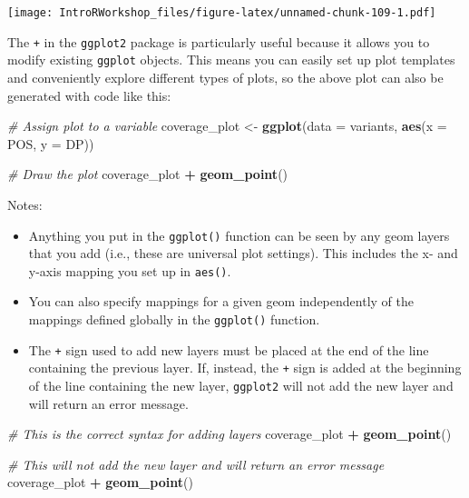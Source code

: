 \documentclass[]{book}
\newenvironment{Shaded}{\begin{snugshade}}{\end{snugshade}}
\newcommand{\CommentTok}[1]{\textcolor[rgb]{0.56,0.35,0.01}{\textit{#1}}}
\newcommand{\DataTypeTok}[1]{\textcolor[rgb]{0.13,0.29,0.53}{#1}}
\newcommand{\KeywordTok}[1]{\textcolor[rgb]{0.13,0.29,0.53}{\textbf{#1}}}
\newcommand{\NormalTok}[1]{#1}
\newcommand{\OperatorTok}[1]{\textcolor[rgb]{0.81,0.36,0.00}{\textbf{#1}}}
\newcommand{\StringTok}[1]{\textcolor[rgb]{0.31,0.60,0.02}{#1}}
\providecommand{\tightlist}{%
  \setlength{\itemsep}{0pt}\setlength{\parskip}{0pt}}
\begin{document}
\texttt{[image: IntroRWorkshop\_files/figure-latex/unnamed-chunk-109-1.pdf]}

The \texttt{+} in the \texttt{ggplot2} package is particularly useful because it allows you to modify existing \texttt{ggplot} objects. This means you can easily set up plot templates and conveniently explore different types of plots, so the above plot can also be generated with code like this:

\begin{Shaded}
\begin{Highlighting}[]
\CommentTok{# Assign plot to a variable}
\NormalTok{coverage_plot <-}\StringTok{ }\KeywordTok{ggplot}\NormalTok{(}\DataTypeTok{data =}\NormalTok{ variants, }\KeywordTok{aes}\NormalTok{(}\DataTypeTok{x =}\NormalTok{ POS, }\DataTypeTok{y =}\NormalTok{ DP))}

\CommentTok{# Draw the plot}
\NormalTok{coverage_plot }\OperatorTok{+}\StringTok{ }
\StringTok{    }\KeywordTok{geom_point}\NormalTok{()}
\end{Highlighting}
\end{Shaded}

Notes:

\begin{itemize}
\tightlist
\item
  Anything you put in the \texttt{ggplot()} function can be seen by any geom layers that you add (i.e., these are universal plot settings). This includes the x- and y-axis mapping you set up in \texttt{aes()}.
\item
  You can also specify mappings for a given geom independently of the mappings defined globally in the \texttt{ggplot()} function.
\item
  The \texttt{+} sign used to add new layers must be placed at the end of the line containing the previous layer. If, instead, the \texttt{+} sign is added at the beginning of the line containing the new layer, \texttt{ggplot2} will not add the new layer and will return an error message.
\end{itemize}

\begin{Shaded}
\begin{Highlighting}[]
\CommentTok{# This is the correct syntax for adding layers}
\NormalTok{coverage_plot }\OperatorTok{+}
\StringTok{  }\KeywordTok{geom_point}\NormalTok{()}

\CommentTok{# This will not add the new layer and will return an error message}
\NormalTok{coverage_plot}
  \OperatorTok{+}\StringTok{ }\KeywordTok{geom_point}\NormalTok{()}
\end{Highlighting}
\end{Shaded}
\end{document}
